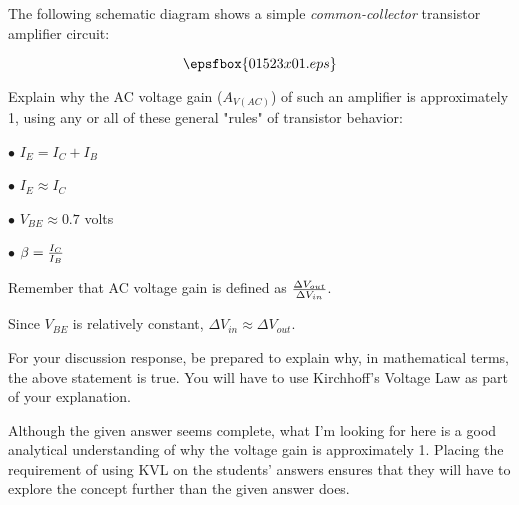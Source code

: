

The following schematic diagram shows a simple {\it common-collector} transistor amplifier circuit:

$$\epsfbox{01523x01.eps}$$

Explain why the AC voltage gain ($A_{V(AC)}$) of such an amplifier is approximately 1, using any or all of these general "rules" of transistor behavior:

\medskip
\item{$\bullet$} $I_E = I_C + I_B$
\item{$\bullet$} $I_E \approx I_C$
\item{$\bullet$} $V_{BE} \approx 0.7$ volts
\item{$\bullet$} $\beta = {I_C \over I_B}$
\medskip

Remember that AC voltage gain is defined as ${\Delta V_{out} \over \Delta V_{in}}$.







Since $V_{BE}$ is relatively constant, $\Delta V_{in} \approx \Delta V_{out}$.
 
\vskip 10pt

For your discussion response, be prepared to explain why, in mathematical terms, the above statement is true.  You will have to use Kirchhoff's Voltage Law as part of your explanation.







Although the given answer seems complete, what I'm looking for here is a good analytical understanding of why the voltage gain is approximately 1.  Placing the requirement of using KVL on the students' answers ensures that they will have to explore the concept further than the given answer does.




